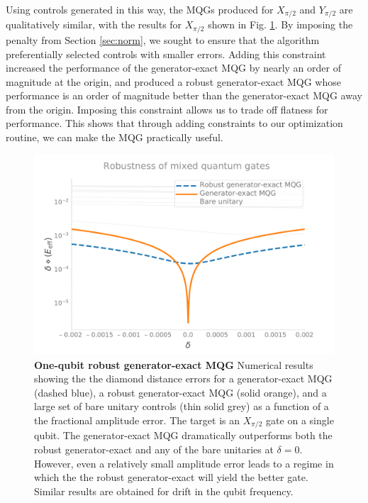 \documentclass[aps,nofootinbib,pra,notitlepage,twocolumn]{revtex4-1}
\newcommand{\0}{\ensuremath{\mathbf{0}}}
\begin{document}
{Using controls generated in this way, the MQGs produced for $X_{\pi/2}$ and $Y_{\pi/2}$ are qualitatively similar, with the results for $X_{\pi/2}$ shown in Fig. \ref{fig:YMQG}. By imposing the penalty from Section \ref{sec:norm}, we sought to ensure that the algorithm preferentially selected controls with smaller errors. Adding this constraint increased the performance of the generator-exact MQG by nearly an order of magnitude at the origin, and produced a robust generator-exact MQG whose performance is an order of magnitude better than the generator-exact MQG away from the origin. Imposing this constraint allows us to trade off flatness for performance. This shows that through adding constraints to our optimization routine, we can make the MQG practically useful. 

\begin{figure}[h]
  \centering
  \includegraphics[width=\columnwidth]{figures/1q_robustness_delta.pdf}
  \caption{\textbf{One-qubit robust generator-exact MQG} Numerical results showing the the diamond distance errors for a generator-exact MQG (dashed blue), a robust generator-exact MQG (solid orange), and a large set of bare unitary controls (thin solid grey) as a function of a the fractional amplitude error. The target is an $X_{\pi/2}$ gate on a single qubit. The generator-exact MQG dramatically outperforms both the robust generator-exact and any of the bare unitaries at $\delta=0$. However, even a relatively small amplitude error leads to a regime in which the the robust generator-exact will yield the better gate. Similar results are obtained for drift in the qubit frequency.}
  \label{fig:YMQG}
\end{figure}

}
\end{document}
